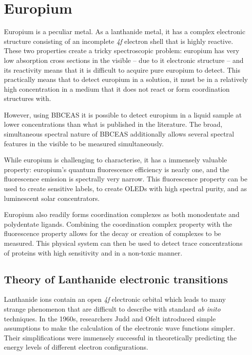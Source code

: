 \chapter{Europium}\label{chap:europium}


Europium is a peculiar metal. As a lanthanide metal, it has a complex
electronic structure consisting of an incomplete \textsl{4f} electron shell
that is highly reactive. These two properties create a tricky spectroscopic
problem: europium has very low absorption cross sections in the visible -- due
to it electronic structure -- and its reactivity means that it is difficult
to acquire pure europium to detect. This practically
means that to detect europium in a solution, it must be in a relatively
high concentration in a medium that it does not react or form coordination
structures with.

However, using \ac{BBCEAS} it is possible to detect europium in a liquid sample
at lower concentrations than what is published in the literature.
 The broad,
simultaneous spectral nature of \ac{BBCEAS} additionally allows several
spectral features in the visible to be measured simultaneously.

While europium is challenging to characterise, it has a immensely valuable
property: europium's quantum fluorescence efficiency is nearly one, and the
fluorescence emission is spectrally very narrow. This fluorescence property can
be used to create sensitive labels, to create OLEDs with high spectral purity,
and as luminescent solar concentrators.

Europium also readily forms coordination complexes as both monodentate and
polydentate ligands. Combining the coordination complex property with the
fluorescence property allows for the decay or creation of complexes to be
measured. This physical system can then be used to detect trace concentrations
of proteins with high sensitivity and in a non-toxic manner.

\section{Theory of Lanthanide electronic transitions}\label{sec:theorty_eu}

Lanthanide ions contain an open \textsl{4f} electronic orbital which leads
to many strange phenomenon that are difficult to describe with standard
\textsl{ab inito} techniques. In the 1960s, researchers Judd and Ofelt introduced simple assumptions to make the calculation of the electronic wave functions simpler. Their simplifications were immensely successful in theoretically predicting the energy levels of different electron configurations.

